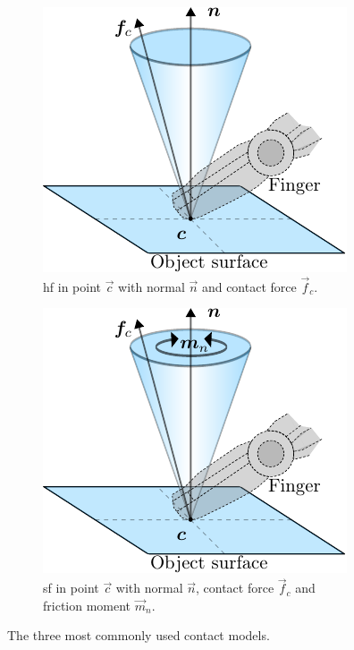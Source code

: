 \begin{figure}[h]
\begin{subfigure}[b]{0.3\textwidth}
		\includegraphics[width=\textwidth]{chapters/modeling/fig/hf-crop.pdf}
		\caption{\gls{hf} in point $\vec{c}$ with normal $\vec{n}$ and contact force $\vec{f}_c$.}
		\label{fig:hf}
	\end{subfigure}
	\hfill
	\begin{subfigure}[b]{0.3\textwidth}
		\centering
		\includegraphics[width=\textwidth]{chapters/modeling/fig/sf-crop.pdf}
		\caption{\gls{sf} in point $\vec{c}$ with normal $\vec{n}$, contact force $\vec{f}_c$ and friction moment $\vec{m}_n$.}
		\label{fig:sf}
	\end{subfigure}
	   \caption{The three most commonly used contact models.}
	   \label{fig:contact-models}
\end{figure}

